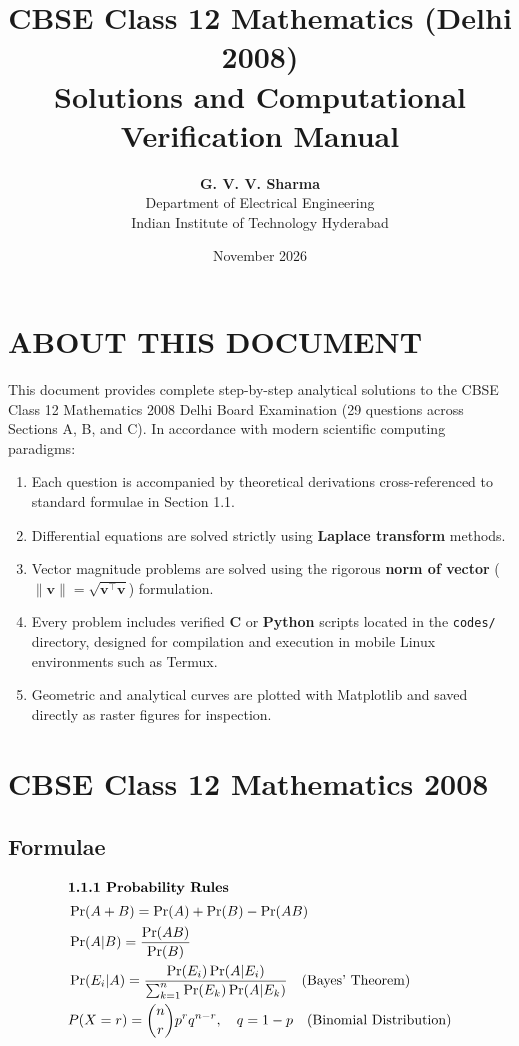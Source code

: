 \documentclass{article}
\title{\textbf{CBSE Class 12 Mathematics (Delhi 2008)}\\\large Solutions and Computational Verification Manual}
\author{\textbf{G. V. V. Sharma} \\ Department of Electrical Engineering \\ Indian Institute of Technology Hyderabad}
\date{November 2026}
\begin{document}
\maketitle

\section*{ABOUT THIS DOCUMENT}
This document provides complete step-by-step analytical solutions to the CBSE Class 12 Mathematics 2008 Delhi Board Examination (29 questions across Sections A, B, and C). In accordance with modern scientific computing paradigms:
\begin{enumerate}
    \item Each question is accompanied by theoretical derivations cross-referenced to standard formulae in Section 1.1.
    \item Differential equations are solved strictly using \textbf{Laplace transform} methods.
    \item Vector magnitude problems are solved using the rigorous \textbf{norm of vector} ($\|\mathbf{v}\| = \sqrt{\mathbf{v}^\top \mathbf{v}}$) formulation.
    \item Every problem includes verified \textbf{C} or \textbf{Python} scripts located in the \texttt{codes/} directory, designed for compilation and execution in mobile Linux environments such as Termux.
    \item Geometric and analytical curves are plotted with Matplotlib and saved directly as raster figures for inspection.
\end{enumerate}

\newpage
\tableofcontents
\newpage

\section{CBSE Class 12 Mathematics 2008}

\subsection{Formulae}

\begin{align}
\intertext{\textbf{1.1.1 Probability Rules}}
& \Pr(A + B) = \Pr(A) + \Pr(B) - \Pr(AB) \label{eq:prob_union} \\
& \Pr(A|B) = \frac{\Pr(AB)}{\Pr(B)} \label{eq:prob_cond} \\
& \Pr(E_i|A) = \frac{\Pr(E_i)\Pr(A|E_i)}{\sum_{k=1}^n \Pr(E_k)\Pr(A|E_k)} \quad \text{(Bayes' Theorem)} \label{eq:bayes} \\
& P(X = r) = \binom{n}{r} p^r q^{n-r}, \quad q = 1 - p \quad \text{(Binomial Distribution)} \label{eq:binomial}
\end{align}
\end{document}
